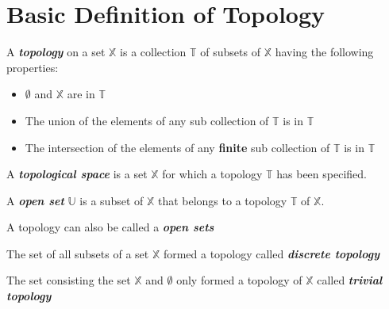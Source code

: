 \section{Basic Definition of Topology}

      \begin{definition}[topology]\label{def:Topology}
            A \textit{\textbf{topology}} on a set $ \mathbb{X} $ is a collection $ \mathbb{T} $ of subsets of $ \mathbb{X} $ having the following properties:

            \begin{itemize}
                  \item $ \emptyset $ and $ \mathbb{X} $ are in $ \mathbb{T} $
                  \item The union of the elements of any sub collection of $ \mathbb{T} $ is in $ \mathbb{T} $
                  \item The intersection of the elements of any \textbf{finite} sub collection of $ \mathbb{T} $ is in $ \mathbb{T} $
            \end{itemize} 
      \end{definition}

      \begin{definition}\label{def:TopologySpace}
            A \textit{\textbf{topological space}} is a set $ \mathbb{X} $ for which a topology $ \mathbb{T} $ has been specified.
      \end{definition}
      
      \begin{definition}\label{def:OpenSet}
            A \textit{\textbf{open set}} $ \mathbb{U} $ is a subset of $ \mathbb{X} $ that belongs to a topology $ \mathbb{T} $ of $ \mathbb{X} $.
      \end{definition}
      
      \begin{definition}\label{def:OpenSets}
            A topology can also be called a \textit{\textbf{open sets}}
      \end{definition}

      \begin{definition}\label{def:DiscreteTopology}
            The set of all subsets of a set $ \mathbb{X} $ formed a topology called \textit{\textbf{discrete topology}}
      \end{definition}

      \begin{definition}\label{def:TrivialTopology}
            The set consisting the set $ \mathbb{X} $ and $ \emptyset $ only formed a topology of $ \mathbb{X} $ called \textit{\textbf{trivial topology}}
      \end{definition}

